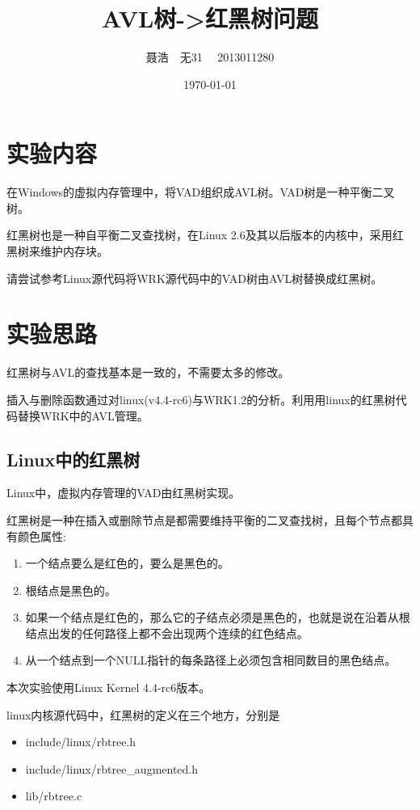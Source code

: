
\title{AVL树->红黑树问题}
\author{聂浩~~无31~~ 2013011280}
\date{\today}

\maketitle
\section{实验内容}
在Windows的虚拟内存管理中，将VAD组织成AVL树。VAD树是一种平衡二叉树。

红黑树也是一种自平衡二叉查找树，在Linux 2.6及其以后版本的内核中，采用红黑树来维护内存块。

请尝试参考Linux源代码将WRK源代码中的VAD树由AVL树替换成红黑树。

\section{实验思路}
红黑树与AVL的查找基本是一致的，不需要太多的修改。

插入与删除函数通过对linux(v4.4-rc6)与WRK1.2的分析。利用用linux的红黑树代码替换WRK中的AVL管理。
\subsection{Linux中的红黑树}
Linux中，虚拟内存管理的VAD由红黑树实现。

红黑树是一种在插入或删除节点是都需要维持平衡的二叉查找树，且每个节点都具有颜色属性:
\begin{enumerate}
    \item{一个结点要么是红色的，要么是黑色的。}
    \item{根结点是黑色的。}
    \item{如果一个结点是红色的，那么它的子结点必须是黑色的，也就是说在沿着从根结点出发的任何路径上都不会出现两个连续的红色结点。}
    \item{从一个结点到一个NULL指针的每条路径上必须包含相同数目的黑色结点。}
\end{enumerate}

本次实验使用Linux Kernel 4.4-rc6版本。

linux内核源代码中，红黑树的定义在三个地方，分别是
\begin{itemize}
    \item{include/linux/rbtree.h}
    \item{include/linux/rbtree\_augmented.h}
    \item{lib/rbtree.c}
\end{itemize}

